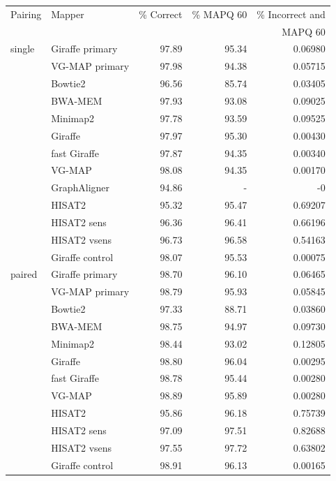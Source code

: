 \documentclass[11pt]{ucscthesis}
\begin{document}
\begin{table}[p]
    \centering
    \begin{tabular}{|l|l|r|r|r|}
    \hline
        Pairing & Mapper & \% Correct & \% MAPQ 60 & \% Incorrect and \\
               &         &            &            & MAPQ 60          \\
        \hline
        single  & Giraffe primary	& 97.89     & 95.34     & 0.06980 \\
                & VG-MAP primary	& 97.98     & 94.38     & 0.05715 \\
                & Bowtie2	        & 96.56     & 85.74     & 0.03405 \\
                & BWA-MEM	        & 97.93     & 93.08     & 0.09025 \\
                & Minimap2	        & 97.78     & 93.59     & 0.09525 \\
                & Giraffe	        & 97.97     & 95.30     & 0.00430 \\
                & fast Giraffe	    & 97.87     & 94.35     & 0.00340 \\
                & VG-MAP           	& 98.08     & 94.35     & 0.00170 \\
                & GraphAligner 	    & 94.86     & -         & -0 \\
                & HISAT2	        & 95.32     & 95.47     & 0.69207 \\
                & HISAT2 sens   	& 96.36     & 96.41     & 0.66196 \\
                & HISAT2 vsens  	& 96.73     & 96.58     & 0.54163 \\
                & Giraffe control	& 98.07     & 95.53     & 0.00075 \\

        \hline
        paired  & Giraffe primary	& 98.70     & 96.10     & 0.06465 \\
                & VG-MAP primary	& 98.79     & 95.93     & 0.05845 \\
                & Bowtie2       	& 97.33     & 88.71     & 0.03860 \\
                & BWA-MEM       	& 98.75     & 94.97     & 0.09730 \\
                & Minimap2      	& 98.44     & 93.02     & 0.12805 \\
                & Giraffe       	& 98.80     & 96.04     & 0.00295 \\
                & fast Giraffe  	& 98.78     & 95.44     & 0.00280 \\
                & VG-MAP        	& 98.89     & 95.89     & 0.00280 \\
                & HISAT2        	& 95.86     & 96.18     & 0.75739 \\
                & HISAT2 sens   	& 97.09     & 97.51     & 0.82688 \\
                & HISAT2 vsens	    & 97.55     & 97.72     & 0.63802 \\
                & Giraffe control	& 98.91     & 96.13     & 0.00165 \\



\end{tabular}
\end{table}
\end{document}
